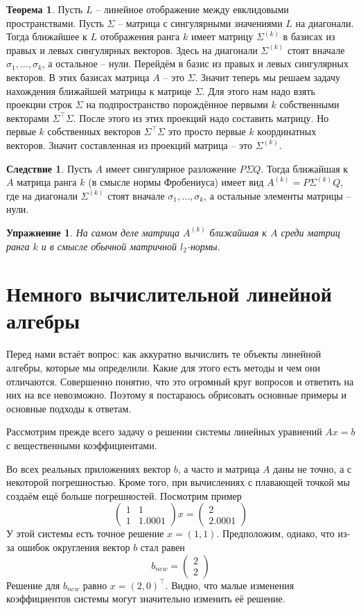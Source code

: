 \documentclass[10pt,a4paper,oneside]{book}
\newtheorem{uprz}{\color{violet!100!black} Упражнение}
\theoremstyle{definition}
\newtheorem{thm}{\color{red!40!black}Теорема}
\newtheorem{cor}{\color{green!45!black}Следствие}
\def\thrm{\begin{thm}}
\def\ethrm{\end{thm}}
\def\crl{\begin{cor}}
\def\ecrl{\end{cor}}
\def\pmat{\begin{pmatrix}}
\def\epmat{\end{pmatrix}}
\def\upr{\begin{uprz}}
\def\eupr{\end{uprz}}
\begin{document}
\thrm Пусть $L$ -- линейное отображение между евклидовыми пространствами. Пусть $\Sigma$ -- матрица с сингулярными значениями $L$ на диагонали. Тогда ближайшее к $L$ отображения ранга $k$ имеет матрицу $\Sigma^{(k)}$ в базисах из правых и левых сингулярных векторов. Здесь  на диагонали $\Sigma^{(k)}$ стоят вначале $\sigma_1,\dots,\sigma_{k}$, а остальное -- нули.
\proof Перейдём в базис из правых и левых сингулярных векторов. В этих базисах матрица $A$ -- это $\Sigma$.
Значит теперь мы решаем задачу нахождения ближайшей матрицы к матрице $\Sigma$. Для этого нам надо взять проекции строк $\Sigma$ на подпространство порождённое первыми $k$ собственными векторами $\Sigma^\top \Sigma$. После этого из этих проекций надо составить матрицу. Но первые $k$ собственных векторов $\Sigma^\top \Sigma$ это просто первые $k$ координатных векторов. Значит составленная из проекций матрица -- это $\Sigma^{(k)}$.
\endproof
\ethrm 

\crl Пусть $A$ имеет сингулярное разложение $P\Sigma Q$. Тогда ближайшая к $A$ матрица ранга $k$ (в смысле нормы Фробениуса) имеет вид $A^{(k)}=P\Sigma^{(k)}Q$, где на диагонали $\Sigma^{(k)}$ стоят вначале $\sigma_1,\dots,\sigma_{k}$, а остальные элементы матрицы -- нули.
\ecrl

\upr На самом деле матрица $A^{(k)}$ ближайшая к $A$ среди матриц ранга $k$ и в смысле обычной матричной $l_2$-нормы. 
\eupr



\section{Немного вычислительной линейной алгебры}


Перед нами встаёт вопрос: как аккуратно вычислить те объекты линейной алгебры, которые мы определили. Какие для этого есть методы и чем они отличаются. Совершенно понятно, что это огромный круг вопросов и ответить на них на все невозможно. Поэтому я постараюсь обрисовать основные примеры и основные подходы к ответам.

Рассмотрим прежде всего задачу о решении системы линейных уравнений $Ax=b$ с вещественными коэффициентами. 

Во всех реальных приложениях вектор $b$, а часто и матрица $A$ даны не точно, а с некоторой погрешностью. Кроме того, при вычислениях с плавающей точкой мы создаём ещё больше погрешностей. Посмотрим  пример
$$ \pmat 1 & 1 \\ 1 & 1.0001 \epmat x = \pmat 2\\ 2.0001 \epmat$$
У этой системы есть точное решение $x=(1,1)$. Предположим, однако, что из-за ошибок округления вектор $b$ стал равен 
$$b_{new}=\pmat 2 \\ 2 \epmat$$
Решение для $b_{new}$ равно $x=(2,0)^\top$. Видно, что малые изменения коэффициентов системы могут значительно изменить её решение.
\end{document}
